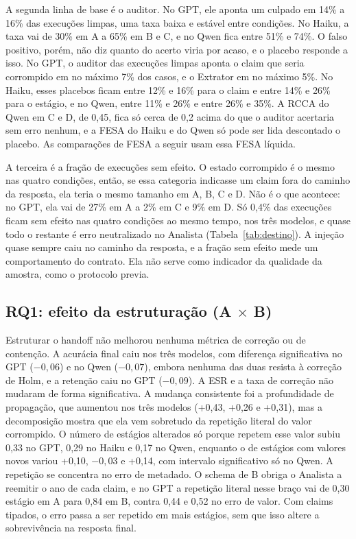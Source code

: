 A segunda linha de base é o auditor.
No GPT, ele aponta um culpado em 14\% a 16\% das execuções limpas, uma taxa baixa e estável entre condições.
No Haiku, a taxa vai de 30\% em A a 65\% em B e C, e no Qwen fica entre 51\% e 74\%.
O falso positivo, porém, não diz quanto do acerto viria por acaso, e o placebo responde a isso.
No GPT, o auditor das execuções limpas aponta o claim que seria corrompido em no máximo 7\% dos casos, e o Extrator em no máximo 5\%.
No Haiku, esses placebos ficam entre 12\% e 16\% para o claim e entre 14\% e 26\% para o estágio, e no Qwen, entre 11\% e 26\% e entre 26\% e 35\%.
A RCCA do Qwen em C e D, de 0,45, fica só cerca de 0,2 acima do que o auditor acertaria sem erro nenhum, e a FESA do Haiku e do Qwen só pode ser lida descontado o placebo. As comparações de FESA a seguir usam essa FESA líquida.

A terceira é a fração de execuções sem efeito.
O estado corrompido é o mesmo nas quatro condições, então, se essa categoria indicasse um claim fora do caminho da resposta, ela teria o mesmo tamanho em A, B, C e D.
Não é o que acontece: no GPT, ela vai de 27\% em A a 2\% em C e 9\% em D.
Só 0,4\% das execuções ficam sem efeito nas quatro condições ao mesmo tempo, nos três modelos, e quase todo o restante é erro neutralizado no Analista (Tabela~\ref{tab:destino}).
A injeção quase sempre caiu no caminho da resposta, e a fração sem efeito mede um comportamento do contrato. Ela não serve como indicador da qualidade da amostra, como o protocolo previa.

\subsection{RQ1: efeito da estruturação (A $\times$ B)}\label{sec:rq1}

Estruturar o handoff não melhorou nenhuma métrica de correção ou de contenção.
A acurácia final caiu nos três modelos, com diferença significativa no GPT ($-0{,}06$) e no Qwen ($-0{,}07$), embora nenhuma das duas resista à correção de Holm, e a retenção caiu no GPT ($-0{,}09$). A ESR e a taxa de correção não mudaram de forma significativa.
A mudança consistente foi a profundidade de propagação, que aumentou nos três modelos (+0,43, +0,26 e +0,31), mas a decomposição mostra que ela vem sobretudo da repetição literal do valor corrompido.
O número de estágios alterados só porque repetem esse valor subiu 0,33 no GPT, 0,29 no Haiku e 0,17 no Qwen, enquanto o de estágios com valores novos variou +0,10, $-0{,}03$ e +0,14, com intervalo significativo só no Qwen.
A repetição se concentra no erro de metadado. O schema de B obriga o Analista a reemitir o ano de cada claim, e no GPT a repetição literal nesse braço vai de 0,30 estágio em A para 0,84 em B, contra 0,44 e 0,52 no erro de valor.
Com claims tipados, o erro passa a ser repetido em mais estágios, sem que isso altere a sobrevivência na resposta final.

